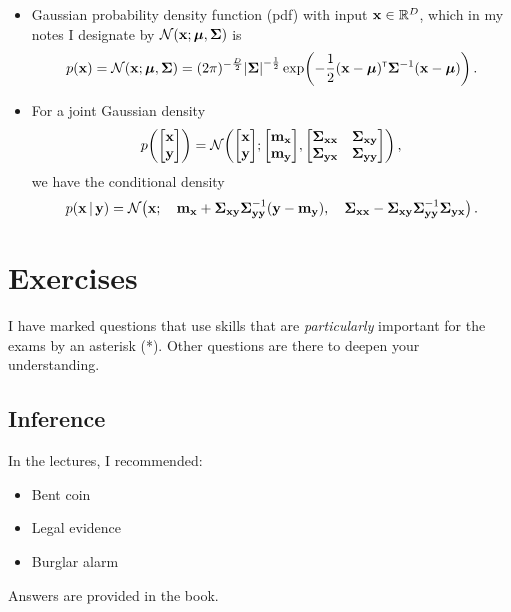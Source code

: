 \documentclass[a4paper]{article}
\newcommand{\mx}{\vm_\vx}
\newcommand{\my}{\vm_\vy}
\newcommand{\covmat}{\boldsymbol{\Sigma}}
\newcommand{\covx}{\boldsymbol{\Sigma}_{\vx\vx}}
\newcommand{\covy}{\boldsymbol{\Sigma}_{\vy\vy}}
\newcommand{\covxy}{\boldsymbol{\Sigma}_{\vx\vy}}
\newcommand{\covyx}{\boldsymbol{\Sigma}_{\vy\vx}}
\theoremstyle{definition}
\begin{document}
\begin{itemize}
\item Gaussian probability density function (pdf) with input $\mathbf{x} \in \mathbb{R}^D$, which in my notes I designate by  $\NormDist{\vx; \vmu, \covmat}$ is
\begin{align}
  p(\vx) = \NormDist{\vx; \vmu, \covmat} = (2\pi)^{-\frac{D}{2}}\detbar{\mathbf{\Sigma}}^{-\frac{1}{2}}\exp\left(-\frac{1}{2}(\vx - \vmu)\transpose\mathbf{\Sigma}^{-1}(\vx-\vmu)\right) \,.
\end{align}
\item For a joint Gaussian density
\begin{align}
\p{\begin{bmatrix}\vx \\ \vy\end{bmatrix}} = \NormDist{\begin{bmatrix}\vx \\ \vy\end{bmatrix}; \begin{bmatrix}\mx \\ \my\end{bmatrix}, \begin{bmatrix}\covx & \covxy \\ \covyx & \covy\end{bmatrix}} \label{eq:gauss-cond-joint} \,,
\end{align}
we have the conditional density
\begin{align}
\p{\vx\given\vy} = \NormDist{\vx; \quad\mx + \covxy\covy\inv(\vy-\my), \quad\covx - \covxy\covy\inv\covyx} \label{eq:gauss-cond} \,.
\end{align}
\end{itemize}



\section{Exercises}
I have marked questions that use skills that are \emph{particularly} important for the exams by an asterisk (*). Other questions are there to deepen your understanding.


\subsection{Inference}
In the lectures, I recommended:
\begin{itemize}
\item Bent coin \citep[\S3.2]{itila}
\item Legal evidence \citep[\S3.4]{itila}
\item Burglar alarm \citep[ch 21]{itila}
\end{itemize}
Answers are provided in the book.
\end{document}
